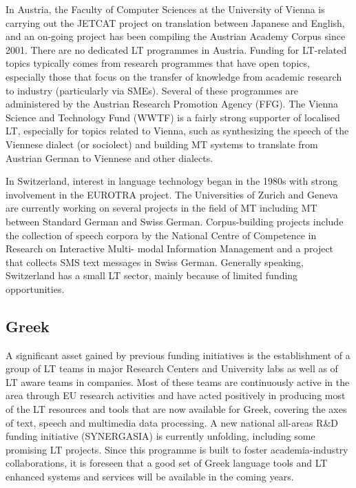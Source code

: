 \documentclass[10pt, plain]{../../metanetpaper}
\begin{document}
\begin{multicols}{2}
\begin{small}
In Austria, the Faculty of Computer Sciences at the University of Vienna is carrying out the JETCAT project on translation between Japanese and English, and an on-going project has been compiling the Austrian Academy Corpus since 2001. There are no dedicated LT programmes in Austria. Funding for LT-related topics typically comes from research programmes that have open topics, especially those that focus on the transfer of knowledge from academic research to industry (particularly via SMEs). Several of these programmes are administered by the Austrian Research Promotion Agency (FFG). The Vienna Science and Technology Fund (WWTF) is a fairly strong supporter of localised LT, especially for topics related to Vienna, such as synthesizing the speech of the Viennese dialect (or sociolect) and building MT systems to translate from Austrian German to Viennese and other dialects.

In Switzerland, interest in language technology began in the 1980s with strong involvement in the EUROTRA project. The Universities of Zurich and Geneva are currently working on several projects in the field of MT including MT between Standard German and Swiss German. Corpus-building projects include the collection of speech corpora by the National Centre of Competence in Research on Interactive Multi- modal Information Management and a project that collects SMS text messages in Swiss German. Generally speaking, Switzerland has a small LT sector, mainly because of limited funding opportunities. 

\subsection*{Greek}
\label{sec:greek}

A significant asset gained by previous funding initiatives is the establishment of a group of LT teams in major Research Centers and University labs as well as of LT aware teams in companies. Most of these teams are continuously active in the area through EU research activities and have acted positively in producing most of the LT resources and tools that are now available for Greek, covering the axes of text, speech and multimedia data processing. A new national all-areas R\&D funding initiative (SYNERGASIA) is currently unfolding, including some promising LT projects. Since this programme is built to foster academia-industry collaborations, it is foreseen that a good set of Greek language tools and LT enhanced systems and services will be available in the coming years.


\end{small}
\end{multicols}
\end{document}
